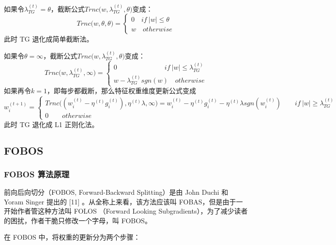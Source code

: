 \documentclass[12pt]{article}
\begin{document}
如果令$\lambda_{TG}^{(t)} = \theta$，截断公式$Trnc\big( w, \lambda_{TG}^{(t)}, \theta \big)$变成：
$$
Trnc\big(w, \theta, \theta \big) = \begin{cases}
0 \quad if \ |w| \le \theta \\
w \quad otherwise
\end{cases}
$$
此时 TG 退化成简单截断法。

如果令$\theta = \infty$，截断公式$Trnc\big( w, \lambda_{TG}^{(t)}, \theta \big)$变成：
$$
Trnc\big(w, \lambda_{TG}^{(t)}, \infty \big) = \begin{cases}
0 \qquad \qquad \qquad \quad if \ |w| \le \lambda_{TG}^{(t)} \\
w - \lambda_{TG}^{(t)} sgn(w)  \quad otherwise
\end{cases}
$$
如果再令$k= 1$，即每步都截断，那么特征权重维度更新公式变成
$$
w_i^{(t+1)} = \begin{cases}
Trnc\big((w_i^{(t)} - \eta^{(t)}g_i^{(t)}), \eta^{(t)}\lambda, \infty \big)  = w_i^{(t)} - \eta^{(t)}g_i^{(t)} - \eta^{(t)}\lambda sgn(w_i^{(t)}) \qquad if \ |w| \ge \lambda_{TG}^{(t)} \\
0 \qquad otherwise
\end{cases}
$$
此时 TG 退化成 L1 正则化法。

\subsection{FOBOS}
\subsubsection{FOBOS 算法原理}
前向后向切分（FOBOS, Forward-Backward Splitting）是由 John Duchi 和 Yoram Singer 提出的 [11] 。从全称上来看，该方法应该叫 FOBAS，但是由于一开始作者管这种方法叫 FOLOS （Forward Looking Subgradients），为了减少读者的困扰，作者干脆只修改一个字母，叫 FOBOS。

在 FOBOS 中，将权重的更新分为两个步骤：




\end{document}
